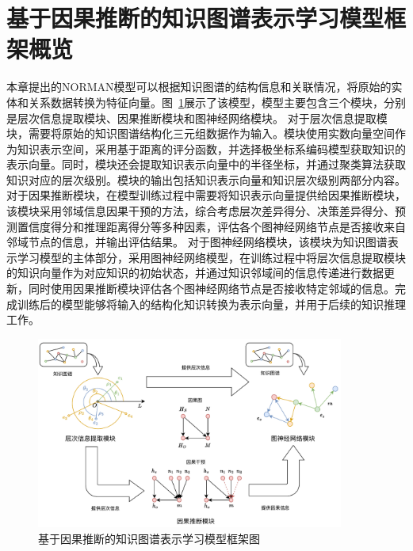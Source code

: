 \documentclass[algorithmlist, AutoFakeBold, AutoFakeSlant, figurelist, tablelist, nomlist, masters]{seuthesix}
\begin{document}
\section{基于因果推断的知识图谱表示学习模型框架概览}
本章提出的NORMAN模型可以根据知识图谱的结构信息和关联情况，将原始的实体和关系数据转换为特征向量。图~\ref{2_NORMAN}展示了该模型，模型主要包含三个模块，分别是层次信息提取模块、因果推断模块和图神经网络模块。
对于层次信息提取模块，需要将原始的知识图谱结构化三元组数据作为输入。模块使用实数向量空间作为知识表示空间，采用基于距离的评分函数，并选择极坐标系编码模型获取知识的表示向量。同时，模块还会提取知识表示向量中的半径坐标，并通过聚类算法获取知识对应的层次级别。模块的输出包括知识表示向量和知识层次级别两部分内容。
对于因果推断模块，在模型训练过程中需要将知识表示向量提供给因果推断模块，该模块采用邻域信息因果干预的方法，综合考虑层次差异得分、决策差异得分、预测置信度得分和推理距离得分等多种因素，评估各个图神经网络节点是否接收来自邻域节点的信息，并输出评估结果。
对于图神经网络模块，该模块为知识图谱表示学习模型的主体部分，采用图神经网络模型，在训练过程中将层次信息提取模块的知识向量作为对应知识的初始状态，并通过知识邻域间的信息传递进行数据更新，同时使用因果推断模块评估各个图神经网络节点是否接收特定邻域的信息。完成训练后的模型能够将输入的结构化知识转换为表示向量，并用于后续的知识推理工作。
\begin{figure}
  \centering
  \includegraphics[width=0.9\textwidth]{2_NORMAN}
  \caption{基于因果推断的知识图谱表示学习模型框架图}
  \label{2_NORMAN}
\end{figure}
\end{document}
